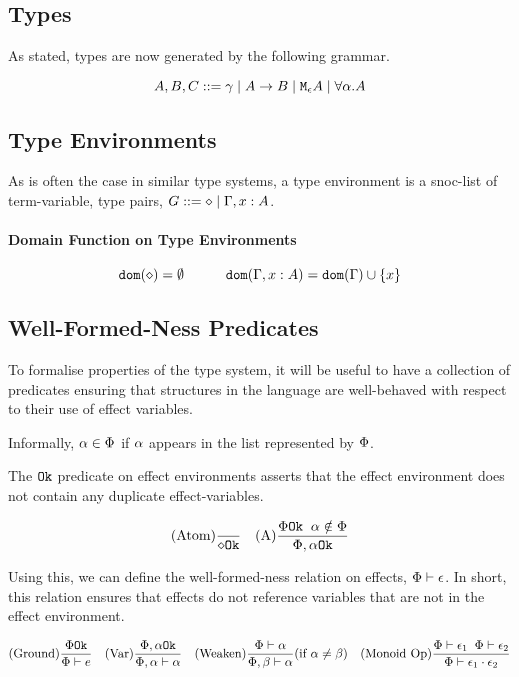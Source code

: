 \documentclass{Report}
\begin{document}
\subsection{Types}
As stated, types are now generated by the following grammar.

$$ A, B, C \gens \ground \mid \ab \mid \mea \mid \all{\a}{A}$$
  
\subsection{Type Environments}
As is often the case in similar type systems, a type environment is a snoc-list of term-variable, type pairs, $G \gens \nil \mid \gax$.

\paragraph{Domain Function on Type Environments}

\[
    \dom{\nil} = \emptyset
    \quad\quad\quad
    \dom{\gax} =  \dom{\G}  \cup \left\{x \right\}
\]

\subsection{Well-Formed-Ness Predicates}
To formalise properties of the type system, it will be useful to have a collection of predicates ensuring that structures in the language are well-behaved with respect to their use of effect variables.

Informally, $\a \in \P$ if $\a$ appears in the list represented by $\P$.

The $\ok{}$ predicate on effect environments asserts that the effect environment does not contain any duplicate effect-variables.

\[
    \treerule{Atom}{}{\ok{\nil}}
\quad
    \treerule{A}{\ok{\P} \s\s \a\notin \P}{\ok{\P, \a}}
\]

Using this, we can define the well-formed-ness relation on effects, $\wellformed{\P}{\e}$. In short, this relation ensures that effects do not reference variables that are not in the effect environment.

\[
    \treerule{Ground}{\ok{\P}}{\wellformed{\P}{e}}
    \quad
    \treerule{Var}{\ok{\P,\a}}{\wellformed{\P,\a}{\a}}
    \quad
    \condtreerule{Weaken}{\wellformed{\P}{\a}}{\wellformed{\P,\b}{\a}}{\a\neq\b}
    \quad
    \treerule{Monoid Op}{\wellformed{\P}{\e_1}\s\s\wellformed{\P}{\e_2}}{\wellformed{\P}{\e_1\dot\e_2}}
\]
\end{document}
